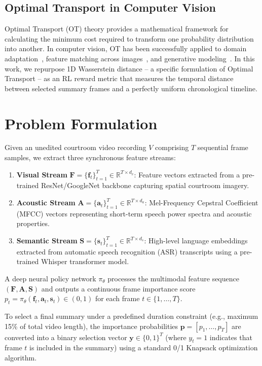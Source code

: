 \documentclass[letterpaper]{article}
\begin{document}
\subsection{Optimal Transport in Computer Vision}

Optimal Transport (OT) theory provides a mathematical framework for calculating the minimum cost required to transform one probability distribution into another. In computer vision, OT has been successfully applied to domain adaptation~\cite{flamary2016optimal}, feature matching across images~\cite{sarlin2020superglue}, and generative modeling~\cite{kolouri2019generalized}. In this work, we repurpose 1D Wasserstein distance -- a specific formulation of Optimal Transport -- as an RL reward metric that measures the temporal distance between selected summary frames and a perfectly uniform chronological timeline.

\section{Problem Formulation}

Given an unedited courtroom video recording $V$ comprising $T$ sequential frame samples, we extract three synchronous feature streams:
\begin{enumerate}
\item \textbf{Visual Stream} $\mathbf{F} = \{\mathbf{f}_t\}_{t=1}^T \in \mathbb{R}^{T \times d_v}$: Feature vectors extracted from a pre-trained ResNet/GoogleNet backbone capturing spatial courtroom imagery.
\item \textbf{Acoustic Stream} $\mathbf{A} = \{\mathbf{a}_t\}_{t=1}^T \in \mathbb{R}^{T \times d_a}$: Mel-Frequency Cepstral Coefficient (MFCC) vectors representing short-term speech power spectra and acoustic properties.
\item \textbf{Semantic Stream} $\mathbf{S} = \{\mathbf{s}_t\}_{t=1}^T \in \mathbb{R}^{T \times d_s}$: High-level language embeddings extracted from automatic speech recognition (ASR) transcripts using a pre-trained Whisper transformer model.
\end{enumerate}

A deep neural policy network $\pi_\theta$ processes the multimodal feature sequence $(\mathbf{F}, \mathbf{A}, \mathbf{S})$ and outputs a continuous frame importance score $p_t = \pi_\theta(\mathbf{f}_t, \mathbf{a}_t, \mathbf{s}_t) \in (0,1)$ for each frame $t \in \{1, \dots, T\}$.

To select a final summary under a predefined duration constraint (e.g., maximum 15\% of total video length), the importance probabilities $\mathbf{p} = [p_1, \dots, p_T]$ are converted into a binary selection vector $\mathbf{y} \in \{0,1\}^T$ (where $y_t=1$ indicates that frame $t$ is included in the summary) using a standard 0/1 Knapsack optimization algorithm.
\end{document}
